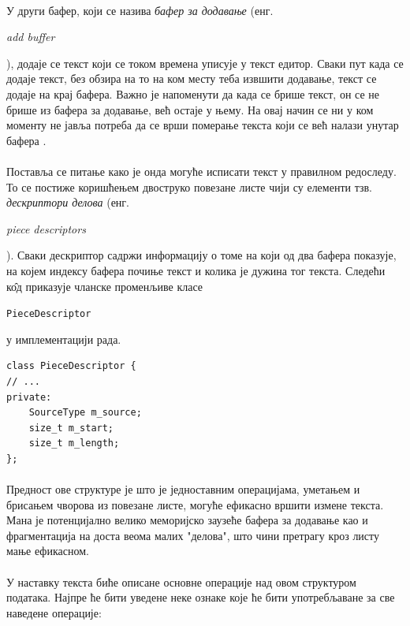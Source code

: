\documentclass[12pt,oneside]{memoir}
\begin{document}
\paragraph{}
У други бафер, који се назива \emph{бафер за додавање} 
(енг. \begin{latinica}\textit{add buffer}\end{latinica}), 
додаје се текст који се током времена уписује у текст едитор. Сваки пут
када се додаје текст, без обзира на то на ком месту теба извшити додавање, 
текст се додаје на крај бафера. Важно је напоменути да када се брише текст, он се не 
брише из бафера за додавање, већ остаје у њему. На овај начин се ни у ком моменту не 
јавља потреба да се врши померање текста који се већ налази унутар бафера
\cite{PieceTable}.

\paragraph{}
Поставља се питање како је онда могуће исписати текст у правилном редоследу. То се постиже
коришћењем двоструко повезане листе чији су елементи тзв. \emph{дескриптори делова} (енг. \begin{latinica}\textit{piece descriptors}\end{latinica}). Сваки дескриптор садржи
информацију о томе на који од два бафера показује, на којем индексу бафера почиње текст и
колика је дужина тог текста. Следећи к\^{о}д приказује чланске променљиве класе \begin{latinica}\verb|PieceDescriptor|\end{latinica} у имплементацији рада.

\begin{verbatim}
class PieceDescriptor {
// ...
private:
    SourceType m_source;
    size_t m_start;
    size_t m_length;
};
\end{verbatim}

\paragraph{}
Предност ове структуре је што је једноставним операцијама, уметањем и брисањем чворова из
повезане листе, могуће ефикасно вршити измене текста. Мана је потенцијално велико меморијско заузеће бафера за додавање као и фрагментација на доста веома малих "делова",
што чини претрагу кроз листу мање ефикасном.

\paragraph{}
У наставку текста биће описане основне операције над овом структуром података. Најпре
ће бити уведене неке ознаке које ће бити употребљаване за све наведене операције:
\end{document}
